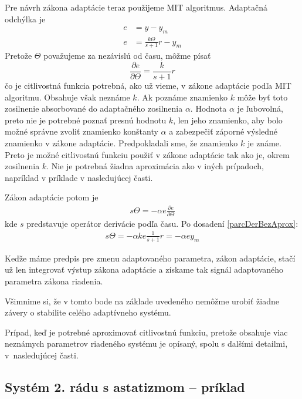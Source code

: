 \documentclass[a4paper, 10pt, ]{article}
\begin{document}
Pre návrh zákona adaptácie teraz použijeme MIT algoritmus. Adaptačná odchýlka je
\begin{subequations}
	\begin{align}
		e &= y - y_m \\
		e &= \frac{k \Theta}{s + 1} r - y_m
	\end{align}
\end{subequations}
Pretože $\Theta$ považujeme za nezávislú od času, môžme písať
\begin{equation} \label{parcDerBezAprox}
	\frac{\partial e}{\partial \Theta}
	=
	\frac{k}{s + 1} r
\end{equation}
čo je citlivostná funkcia potrebná, ako už vieme, v zákone adaptácie podľa MIT algoritmu. Obsahuje však neznáme $k$. Ak poznáme znamienko $k$ môže byť toto zosilnenie absorbované do adaptačného zosilnenia $\alpha$. Hodnota $\alpha$ je ľubovolná, preto nie je potrebné poznať presnú hodnotu $k$, len jeho znamienko, aby bolo možné správne zvoliť znamienko konštanty $\alpha$ a zabezpečiť záporné výsledné znamienko v zákone adaptácie. Predpokladali sme, že znamienko $k$ je známe. Preto je možné citlivostnú funkciu použiť v zákone adaptácie tak ako je, okrem zosilnenia $k$. Nie je potrebná žiadna aproximácia ako v iných prípadoch, napríklad v príklade v nasledujúcej časti.

Zákon adaptácie potom je
\begin{align}
	 	s \Theta =  - \alpha e \frac{\partial e}{\partial \Theta}
\end{align}
kde $s$ predstavuje operátor derivácie podľa času. Po dosadení \eqref{parcDerBezAprox}:
\begin{align}
 	s \Theta =  - \alpha k e \frac{1}{s + 1} r = - \alpha  e y_m
\end{align}

Keďže máme predpis pre zmenu adaptovaného parametra, zákon adaptácie, stačí už len integrovať výstup zákona adaptácie a získame tak signál adaptovaného parametra zákona riadenia.

Všimnime si, že v tomto bode na základe uvedeného nemôžme urobiť žiadne závery o stabilite celého adaptívneho systému.

Prípad, keď je potrebné aproximovať citlivostnú funkciu, pretože obsahuje viac neznámych parametrov riadeného systému je opísaný, spolu s ďalšími detailmi, v~nasledujúcej časti.







\subsection{Systém 2. rádu s astatizmom -- príklad}
\end{document}
